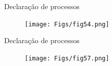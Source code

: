 \documentclass[aspectratio=169]{beamer}
\begin{document}
\begin{frame}{Declaração de processos}
	\justifying
	
	
%		
	
	
	\begin{figure}[h]
		\centering
		\texttt{[image: Figs/fig54.png]}
	\end{figure}
	
\end{frame}
%	
%	
%	
%	
%	
%	
\begin{frame}{Declaração de processos}
	\justifying
	
	
	\begin{figure}[h]
		\centering
		\texttt{[image: Figs/fig57.png]}
	\end{figure}
	
\end{frame}
\end{document}
